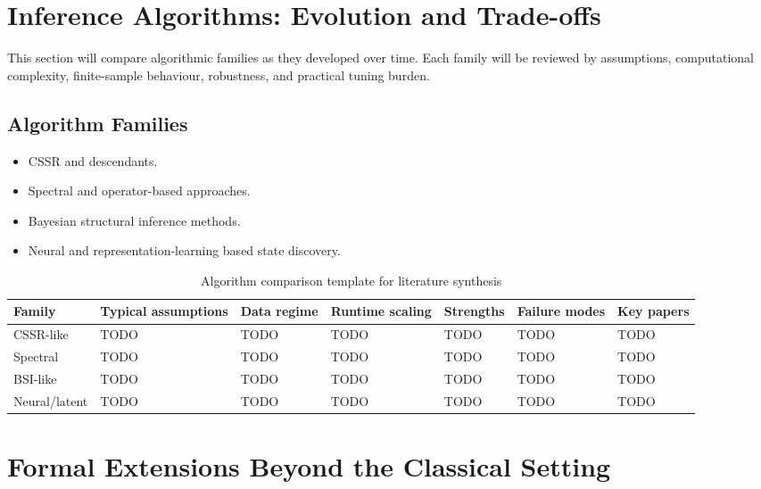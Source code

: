 \documentclass[11pt,twocolumn]{article}
\begin{document}
\section{Inference Algorithms: Evolution and Trade-offs}
\label{sec:inference}

This section will compare algorithmic families as they developed over time.
Each family will be reviewed by assumptions, computational complexity, finite-sample behaviour, robustness, and practical tuning burden.

\subsection{Algorithm Families}

\begin{itemize}[nosep]
    \item CSSR and descendants.
    \item Spectral and operator-based approaches.
    \item Bayesian structural inference methods.
    \item Neural and representation-learning based state discovery.
\end{itemize}

\begin{table}[t]
\centering
\caption{Algorithm comparison template for literature synthesis}
\label{tab:algo-synthesis}
\small
\begin{tabular}{lllllll}
\toprule
Family & Typical assumptions & Data regime & Runtime scaling & Strengths & Failure modes & Key papers \\
\midrule
CSSR-like & TODO & TODO & TODO & TODO & TODO & TODO \\
Spectral & TODO & TODO & TODO & TODO & TODO & TODO \\
BSI-like & TODO & TODO & TODO & TODO & TODO & TODO \\
Neural/latent & TODO & TODO & TODO & TODO & TODO & TODO \\
\bottomrule
\end{tabular}
\end{table}

\section{Formal Extensions Beyond the Classical Setting}
\label{sec:extensions}
\end{document}
